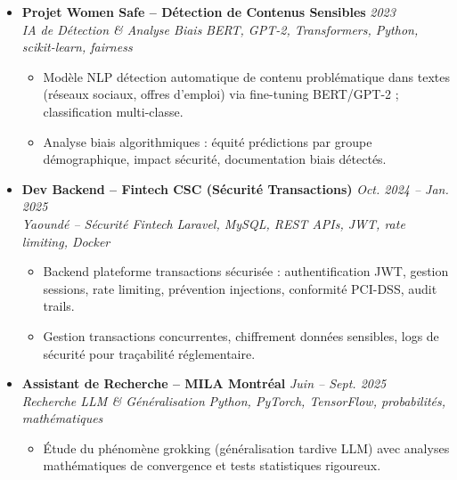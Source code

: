 \documentclass[a4paper,11pt]{article}
\begin{document}
\begin{itemize}[leftmargin=*, label={-}]
    \item \textbf{Projet Women Safe -- D\'etection de Contenus Sensibles} \hfill \textit{2023} \\
    \textit{IA de Détection \& Analyse Biais} \hfill \textit{BERT, GPT-2, Transformers, Python, scikit-learn, fairness}
    \vspace{-2pt}
    \begin{itemize}[leftmargin=0.4cm, nosep, label=\tiny$\bullet$]
        \item \small{Modèle NLP détection automatique de contenu problématique dans textes (réseaux sociaux, offres d'emploi) via fine-tuning BERT/GPT-2 ; classification multi-classe.}
        \item \small{Analyse biais algorithmiques : équité prédictions par groupe démographique, impact sécurité, documentation biais détectés.}
    \end{itemize}
    \vspace{3pt}

    \item \textbf{Dev Backend -- Fintech CSC (Sécurité Transactions)} \hfill \textit{Oct. 2024 -- Jan. 2025} \\
    \textit{Yaoundé -- Sécurité Fintech} \hfill \textit{Laravel, MySQL, REST APIs, JWT, rate limiting, Docker}
    \vspace{-2pt}
    \begin{itemize}[leftmargin=0.4cm, nosep, label=\tiny$\bullet$]
        \item \small{Backend plateforme transactions sécurisée : authentification JWT, gestion sessions, rate limiting, prévention injections, conformité PCI-DSS, audit trails.}
        \item \small{Gestion transactions concurrentes, chiffrement données sensibles, logs de sécurité pour traçabilité réglementaire.}
    \end{itemize}
    \vspace{3pt}

    \item \textbf{Assistant de Recherche -- MILA Montréal} \hfill \textit{Juin -- Sept. 2025} \\
    \textit{Recherche LLM \& Généralisation} \hfill \textit{Python, PyTorch, TensorFlow, probabilités, mathématiques}
    \vspace{-2pt}
    \begin{itemize}[leftmargin=0.4cm, nosep, label=\tiny$\bullet$]
        \item \small{Étude du phénomène grokking (généralisation tardive LLM) avec analyses mathématiques de convergence et tests statistiques rigoureux.}
    \end{itemize}
    \vspace{3pt}


\end{itemize}
\end{document}

